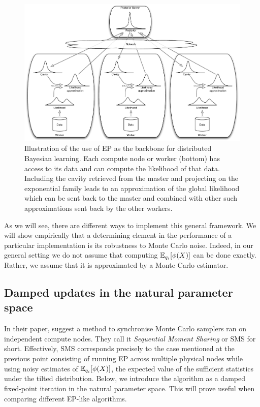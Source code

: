 \begin{figure}[!h]
	\center
	\includegraphics[width=\textwidth]{figures/snep/PosteriorServer}
	\caption{\label{fig:SNEP-arch} Illustration of the use of EP as the backbone for distributed Bayesian learning. Each compute node or worker (bottom) has access to its data and can compute the likelihood of that data. Including the cavity retrieved from the master and projecting on the exponential family leads to an approximation of the global likelihood which can be sent back to the master and combined with other such approximations sent back by the other workers.}
\end{figure}

As we will see, there are different ways to implement this general framework.
We will show empirically that a determining element in the performance of a particular implementation is its robustness to Monte Carlo noise. 
Indeed, in our general setting we do not assume that computing $\mathbb E_{q_i}[\phi(X)]$ can be done exactly. Rather, we assume that it is approximated by a Monte Carlo estimator.

\subsection{Damped updates in the natural parameter space}
In their paper, \citet{xu14} suggest a method to synchronise Monte Carlo samplers ran on independent compute nodes. They call it \emph{Sequential Moment Sharing} or SMS for short. Effectively, SMS corresponds precisely to the case mentioned at the previous point consisting of running EP across multiple physical nodes while using noisy estimates of $\mathbb E_{q_i}[\phi(X)]$, the expected value of the sufficient statistics under the tilted distribution. 
Below, we introduce the algorithm as a damped fixed-point iteration in the natural parameter space. This will prove useful when comparing different EP-like algorithms.

